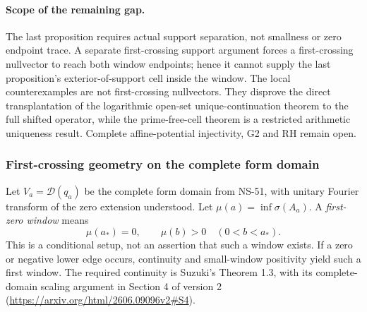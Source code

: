 \documentclass[11pt]{article}
\theoremstyle{remark}
\begin{document}
\paragraph{Scope of the remaining gap.}
The last proposition requires actual support separation, not smallness
or zero endpoint trace. A separate first-crossing support argument forces
a first-crossing nullvector to reach both window endpoints; hence it
cannot supply the last proposition's exterior-of-support cell inside
the window. The local counterexamples are not first-crossing nullvectors.
They disprove the direct transplantation of the logarithmic open-set
unique-continuation theorem to the full shifted operator, while the
prime-free-cell theorem is a restricted arithmetic uniqueness result.
Complete affine-potential injectivity, G2 and RH remain open.

\subsubsection{First-crossing geometry on the complete form domain}

Let $V_a=\mathcal D(q_a)$ be the complete form domain from NS-51,
with unitary Fourier transform of the zero extension understood.
Let $\mu(a)=\inf\sigma(A_a)$. A \emph{first-zero window} means
\begin{equation}\label{eq:ns55fc-first}
 \mu(a_*)=0,\qquad \mu(b)>0\quad(0<b<a_*).
\end{equation}
This is a conditional setup, not an assertion that such a window exists.
If a zero or negative lower edge occurs, continuity and small-window
positivity yield such a first window. The required continuity is
Suzuki's Theorem 1.3, with its complete-domain scaling argument in
Section 4 of version 2
(\url{https://arxiv.org/html/2606.09096v2#S4}).
\end{document}
